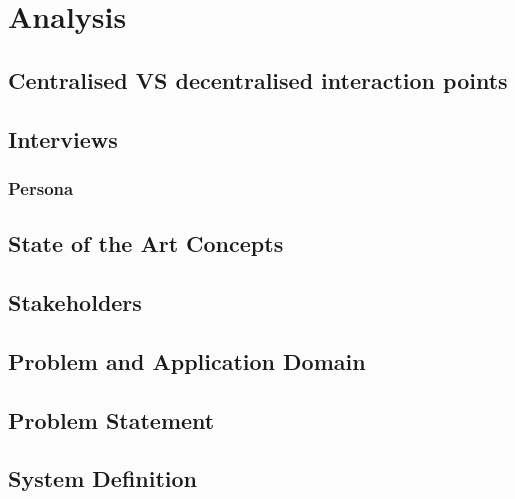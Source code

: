 \chapter{Analysis}


\section{Centralised VS decentralised interaction points}


\section{Interviews}





\subsection{Persona}


% 
\section{State of the Art Concepts}


\section{Stakeholders}


\section{Problem and Application Domain}


\section{Problem Statement}


\section{System Definition}

